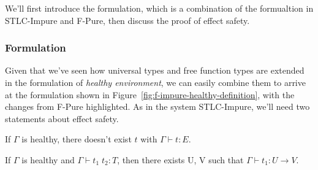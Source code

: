 We'll first introduce the formulation, which is a combination of the
formualtion in STLC-Impure and F-Pure, then discuss the proof of
effect safety.

\subsubsection{Formulation}

Given that we've seen how universal types and free function types are
extended in the formulation of \emph{healthy environment}, we can
easily combine them to arrive at the formulation shown in
Figure~\ref{fig:f-impure-healthy-definition}, with the changes from
F-Pure highlighted. As in the system STLC-Impure, we'll need two
statements about effect safety.

\begin{definition}
  If $\Gamma$ is healthy, there doesn't exist $t$ with
  $\Gamma \vdash t : E$.
\end{definition}

\begin{definition}
  If $\Gamma$ is healthy and $\Gamma \vdash t_1 \; t_2 : T$, then
  there exists U, V such that $\Gamma \vdash t_1 : U \to V$.
\end{definition}

